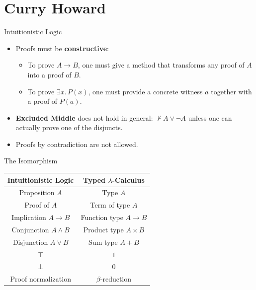 \documentclass[aspectratio=169]{beamer}
\begin{document}
\section{Curry Howard}
\begin{frame}{Intuitionistic Logic}
  \begin{itemize}
  \item Proofs must be \textbf{constructive}:  
    \begin{itemize}
    \item To prove $A \to B$, one must give a method that transforms any proof of $A$ into a proof of $B$.
    \item To prove $\exists x.\, P(x)$, one must provide a concrete witness $a$ together with a proof of $P(a)$.
    \end{itemize}

  \item \textbf{Excluded Middle} does not hold in general:  
    \(
    \not\vdash A \lor \neg A
    \)
    unless one can actually prove one of the disjuncts.

  \item Proofs by contradiction are not allowed.
  \end{itemize}
\end{frame}

\begin{frame}{The Isomorphism}
  \begin{table}[h!]
    \centering
    \begin{tabular}{|c|c|}
      \hline
      \textbf{Intuitionistic Logic} & \textbf{Typed $\lambda$-Calculus} \\
      \hline
      Proposition $A$ & Type $A$ \\
      Proof of $A$ & Term of type $A$ \\
      Implication $A \rightarrow B$ & Function type $A \to B$ \\
      Conjunction $A \land B$ & Product type $A \times B$ \\
      Disjunction $A \lor B$ & Sum type $A + B$ \\
      $\top$ & $1$ \\
      $\bot$ & $0$ \\
      Proof normalization & $\beta$-reduction \\
      \hline
    \end{tabular}
    \label{tab:curry-howard}
  \end{table}
\end{frame}
\end{document}

